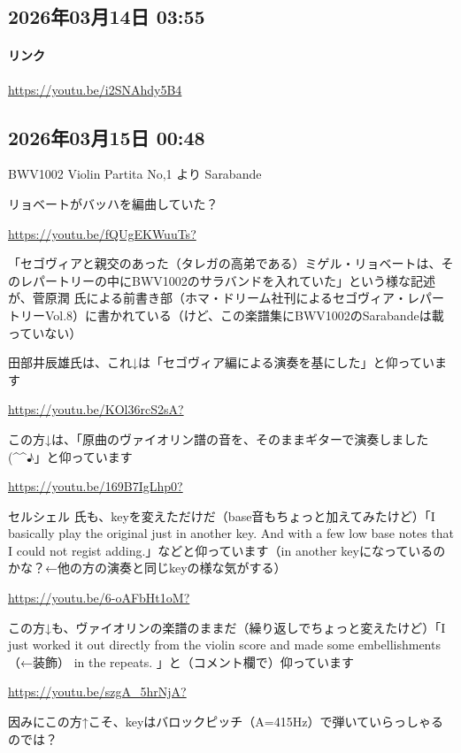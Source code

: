 \subsection*{2026年03月14日 03:55}

\paragraph{リンク}
\url{https://youtu.be/i2SNAhdy5B4}

\subsection*{2026年03月15日 00:48}

BWV1002 Violin Partita No,1 より Sarabande

リョベートがバッハを編曲していた？

\url{https://youtu.be/fQUgEKWuuTs?}

「セゴヴィアと親交のあった（タレガの高弟である）ミゲル・リョベートは、そのレパートリーの中にBWV1002のサラバンドを入れていた」という様な記述が、菅原潤 氏による前書き部（ホマ・ドリーム社刊によるセゴヴィア・レパートリーVol.8）に書かれている（けど、この楽譜集にBWV1002のSarabandeは載っていない）

田部井辰雄氏は、これ↓は「セゴヴィア編による演奏を基にした」と仰っています

\url{https://youtu.be/KOl36rcS2sA?}

この方↓は、「原曲のヴァイオリン譜の音を、そのままギターで演奏しました(\textasciicircum{}\textasciicircum{}♪」と仰っています

\url{https://youtu.be/169B7IgLhp0?}

セルシェル 氏も、keyを変えただけだ（base音もちょっと加えてみたけど）「I basically play the original just in another key. And with a few low base notes that I could not regist adding.」などと仰っています（in another keyになっているのかな？←他の方の演奏と同じkeyの様な気がする）

\url{https://youtu.be/6-oAFbHt1oM?}

この方↓も、ヴァイオリンの楽譜のままだ（繰り返しでちょっと変えたけど）「I just worked it out directly from the violin score and made some embellishments（←装飾） in the repeats. 」と（コメント欄で）仰っています

\url{https://youtu.be/szgA_5hrNjA?}

因みにこの方↑こそ、keyはバロックピッチ（A=415Hz）で弾いていらっしゃるのでは？

